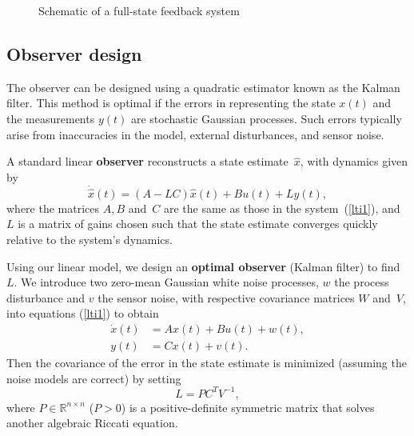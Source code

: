 \documentclass[12pt,lot, lof]{puthesis}
\begin{document}
\begin{figure}[htbp]
  \centering
  \caption{Schematic of a full-state feedback system}
\end{figure}


\subsection{ Observer design}
The observer can be designed using a quadratic estimator known as the Kalman filter. This method is optimal if the errors in representing the state $x(t)$ and the measurements $y(t)$ are stochastic Gaussian processes. Such errors typically arise from inaccuracies in the model, external disturbances, and sensor noise.

A standard linear \textbf{observer} reconstructs a state estimate~$\hat x$, with dynamics given by
\begin{equation}
		\dot{\hat{x}}(t) = (A- L C) \hat{x}(t) + B u(t) + L y(t),
		\label{obslti}
\end{equation}
where the matrices $A,B$ and~$C$ are the same as those in the system~(\ref{lti1}), and $L$ is a matrix of gains chosen such that the state estimate converges quickly relative to the system's dynamics.

Using our linear model, we design an \textbf{optimal observer} (Kalman filter) to find~$L$.
We introduce two zero-mean Gaussian white noise processes, $w$ the process disturbance and $v$ the sensor noise, with respective covariance matrices $W$ and~$V$, into equations (\ref{lti1}) to obtain
\begin{align}
	\dot{x}(t) &= A x(t) + B u(t) + w(t),\\
	y(t) &= C x(t) + v(t). 
\end{align}
Then the covariance of the error in the state estimate is minimized (assuming the noise models are correct) by setting
\begin{equation}
	L = P C^T V^{-1},
\end{equation}
where $P \in \mathbb{R}^{n \times n}$ ($P>0$)  is a positive-definite symmetric matrix that solves another algebraic Riccati equation.
\end{document}
